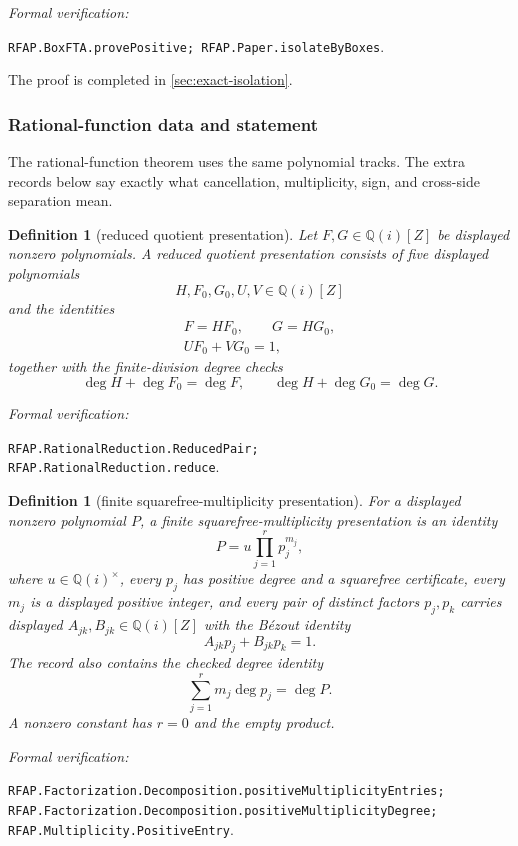 \documentclass[11pt]{article}
\newtheorem{definition}[theorem]{Definition}
\newcommand{\Qi}{\mathbb{Q}(i)}
\newcommand{\leanref}[1]{\par\smallskip\noindent
  \emph{Formal verification:}\par\nobreak
  {\raggedright\nolinkurl{#1}.\par}}
\begin{document}
\leanref{RFAP.BoxFTA.provePositive; RFAP.Paper.isolateByBoxes}

The proof is completed in \cref{sec:exact-isolation}.

\subsubsection{Rational-function data and statement}

The rational-function theorem uses the same polynomial tracks.  The extra
records below say exactly what cancellation, multiplicity, sign, and
cross-side separation mean.

\begin{definition}[reduced quotient presentation]
\label{def:reduced-quotient}
Let $F,G\in\Qi[Z]$ be displayed nonzero polynomials.  A
\emph{reduced quotient presentation} consists of five displayed polynomials
\[
                        H,F_0,G_0,U,V\in\Qi[Z]
\]
and the identities
\[
 \begin{gathered}
 F=HF_0,\qquad G=HG_0,\\
 UF_0+VG_0=1,
 \end{gathered}
\]
together with the finite-division degree checks
\[
 \deg H+\deg F_0=\deg F,
 \qquad
 \deg H+\deg G_0=\deg G.
\]
\end{definition}

\leanref{RFAP.RationalReduction.ReducedPair;
RFAP.RationalReduction.reduce}

\begin{definition}[finite squarefree-multiplicity presentation]
\label{def:squarefree-multiplicity-presentation}
For a displayed nonzero polynomial $P$, a
\emph{finite squarefree-multiplicity presentation} is an identity
\[
                 P=u\prod_{j=1}^{r}p_j^{m_j},
\]
where $u\in\Qi^\times$, every $p_j$ has positive degree and a squarefree
certificate, every $m_j$ is a displayed positive integer, and every pair of
distinct factors $p_j,p_k$ carries displayed $A_{jk},B_{jk}\in\Qi[Z]$ with
the Bézout identity
\[
                 A_{jk}p_j+B_{jk}p_k=1.
\]
The record also contains the checked degree identity
\[
                  \sum_{j=1}^{r}m_j\deg p_j=\deg P.
\]
A nonzero constant has $r=0$ and the empty product.
\end{definition}

\leanref{RFAP.Factorization.Decomposition.positiveMultiplicityEntries;
RFAP.Factorization.Decomposition.positiveMultiplicityDegree;
RFAP.Multiplicity.PositiveEntry}
\end{document}
